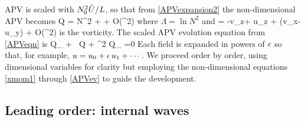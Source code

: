 \documentclass[12pt, oneside]{book}
\begin{document}
APV is scaled with $N_0^2 \tilde U/L$, so that from \eqref{APVexpansion2} the non-dimensional APV becomes 
\beq
Q = N^2  + \ep {} + O\left(\ep^2\right)\com
\label{APVexpand}
\eeq
where $\Lambda = \ln N^2$ and 
\beq
\bomega = -v_z\bxh + u_z \byh + (v_x-u_y) \bzh + O\left(\ep^2\right) \com
\eeq
is the vorticity.  The scaled APV evolution equation from \eqref{APVeqn} is
\beq
Q_{\tt} + \ep \, \bu \bcdot \bnabla Q + \ep^2 Q_{\bt} =0\per
\label{APVev}
\eeq
Each field is expanded in powers of $\epsilon$ so that, for example, $u = u_0 + \epsilon \, u_1 + \cdots$.  We proceed order by order, using dimensional variables for clarity but employing the non-dimensional equations \eqref{xmom1} through \eqref{APVev} to guide the development.

\subsection{Leading order: internal waves}
\label{o0}
\end{document}
